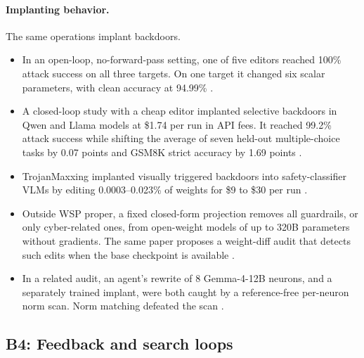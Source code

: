 \paragraph{Implanting behavior.} The same operations implant backdoors.
\begin{itemize}[leftmargin=*,itemsep=2pt]
\item In an open-loop, no-forward-pass setting, one of five editors reached 100\% attack success on all three targets. On one target it changed six scalar parameters, with clean accuracy at 94.99\% \citep{ax2611_17395}.
\item A closed-loop study with a cheap editor implanted selective backdoors in Qwen and Llama models at \$1.74 per run in API fees. It reached 99.2\% attack success while shifting the average of seven held-out multiple-choice tasks by 0.07 points and GSM8K strict accuracy by 1.69 points \citep{ax2611_27920}.
\item TrojanMaxxing implanted visually triggered backdoors into safety-classifier VLMs by editing 0.0003--0.023\% of weights for \$9 to \$30 per run \citep{ax2611_27425}.
\item Outside WSP proper, a fixed closed-form projection removes all guardrails, or only cyber-related ones, from open-weight models of up to 320B parameters without gradients. The same paper proposes a weight-diff audit that detects such edits when the base checkpoint is available \citep{ax2611_27426}.
\item In a related audit, an agent's rewrite of 8 Gemma-4-12B neurons, and a separately trained implant, were both caught by a reference-free per-neuron norm scan. Norm matching defeated the scan \citep{zen24156363}.
\end{itemize}

\subsection{B4: Feedback and search loops}
\label{sec:loops}

